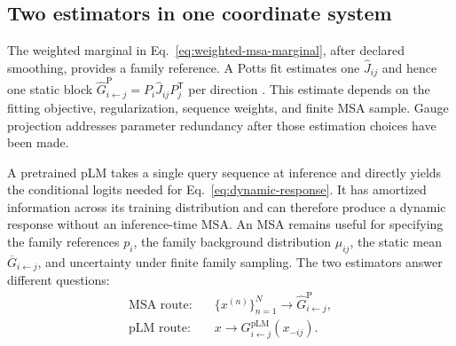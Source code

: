 \documentclass[10pt]{article}
\theoremstyle{definition}
\theoremstyle{remark}
\newcommand{\BookSection}[1]{\subsection{#1}}
\begin{document}
\BookSection{Two estimators in one coordinate system}

The weighted marginal in Eq.~\ref{eq:weighted-msa-marginal}, after declared smoothing, provides a
family reference.  A Potts fit estimates one $\widehat J_{ij}$ and hence one static block
$\widehat G_{i\leftarrow j}^{\mathrm P}=P_i\widehat J_{ij}P_j^{\mathsf T}$ per direction
\cite{morcos2011,ekeberg2013,cocco2018}.  This estimate depends on the fitting objective,
regularization, sequence weights, and finite MSA sample.  Gauge projection addresses parameter
redundancy after those estimation choices have been made.

A pretrained pLM takes a single query sequence at inference and directly yields the conditional
logits needed for Eq.~\ref{eq:dynamic-response}.  It has amortized information across its training
distribution and can therefore produce a dynamic response without an inference-time MSA.  An MSA
remains useful for specifying the family references $p_i$, the family background
distribution $\mu_{ij}$, the static mean $\overline G_{i\leftarrow j}$, and uncertainty under finite family
sampling.  The two estimators answer different questions:
\begin{equation}
\begin{aligned}
\text{MSA route:}&\quad
\{x^{(n)}\}_{n=1}^N\longrightarrow\widehat G_{i\leftarrow j}^{\mathrm P},\\
\text{pLM route:}&\quad
x\longrightarrow G_{i\leftarrow j}^{\mathrm{pLM}}(x_{-ij}).
\end{aligned}
\label{eq:two-estimators}
\end{equation}
\end{document}
